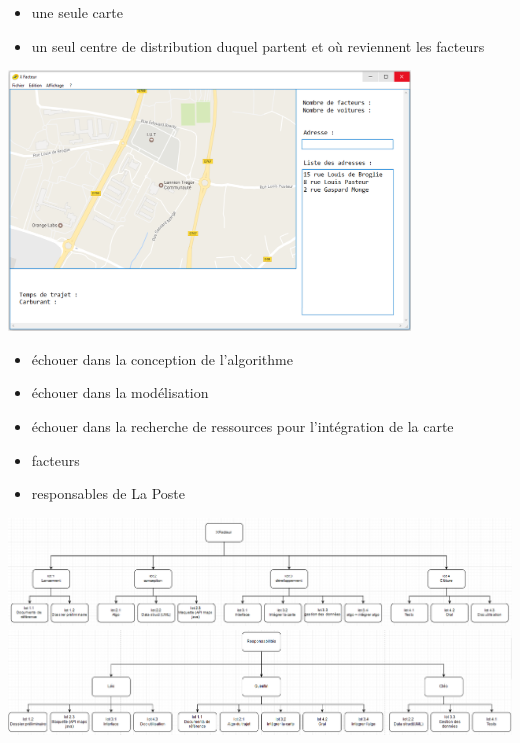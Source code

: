 \documentclass[a4paper, 12pt]{article}
\begin{document}
\begin{itemize}
\item une seule carte
\item un seul centre de distribution duquel partent et où reviennent les facteurs
\end{itemize}

\includegraphics[width=0.8\textwidth]{img/maquette}

\clearpage
{}
\begin{itemize}
\item échouer dans la conception de l’algorithme
\item échouer dans la modélisation
\item échouer dans la recherche de ressources pour l’intégration de la carte
\end{itemize}

\begin{itemize}
\item facteurs
\item responsables de La Poste
\end{itemize}

\clearpage
\begin{multicols}{2}
\includegraphics[angle=90, height=0.9\textheight]{img/diag-taches}
\columnbreak
{}
\includegraphics[angle=90, height=0.9\textheight]{img/diag-responsabilites}
\end{multicols}
\end{document}
